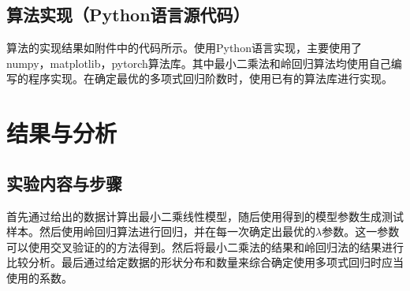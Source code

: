 \documentclass[final]{cvpr}
\begin{document}
\subsection{算法实现（Python语言源代码）}
算法的实现结果如附件中的代码所示。使用Python语言实现，主要使用了numpy，matplotlib，pytorch算法库。其中最小二乘法和岭回归算法均使用自己编写的程序实现。在确定最优的多项式回归阶数时，使用已有的算法库进行实现。
\section{结果与分析}
\subsection{实验内容与步骤}
首先通过给出的数据计算出最小二乘线性模型，随后使用得到的模型参数生成测试样本。然后使用岭回归算法进行回归，并在每一次确定出最优的$\lambda$参数。这一参数可以使用交叉验证的的方法得到。然后将最小二乘法的结果和岭回归法的结果进行比较分析。最后通过给定数据的形状分布和数量来综合确定使用多项式回归时应当使用的系数。
\end{document}
